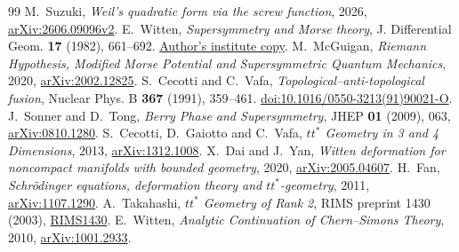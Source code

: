 \begin{thebibliography}{99}
M.~Suzuki, \emph{Weil's quadratic form via the screw function},
2026, \href{https://arxiv.org/abs/2606.09096v2}{arXiv:2606.09096v2}.
E.~Witten, \emph{Supersymmetry and Morse theory},
J. Differential Geom. \textbf{17} (1982), 661--692.
\href{https://www.ias.edu/sites/default/files/sns/files/supersymmetry-and-morse-theory-1982.pdf}{Author's institute copy}.
M.~McGuigan, \emph{Riemann Hypothesis, Modified Morse Potential and Supersymmetric Quantum Mechanics},
2020, \href{https://arxiv.org/abs/2002.12825}{arXiv:2002.12825}.
S.~Cecotti and C.~Vafa, \emph{Topological--anti-topological fusion},
Nuclear Phys. B \textbf{367} (1991), 359--461.
\href{https://doi.org/10.1016/0550-3213(91)90021-O}{doi:10.1016/0550-3213(91)90021-O}.
J.~Sonner and D.~Tong, \emph{Berry Phase and Supersymmetry},
JHEP \textbf{01} (2009), 063,
\href{https://arxiv.org/abs/0810.1280}{arXiv:0810.1280}.
S.~Cecotti, D.~Gaiotto and C.~Vafa, \emph{$tt^*$ Geometry in 3 and 4 Dimensions},
2013, \href{https://arxiv.org/abs/1312.1008}{arXiv:1312.1008}.
X.~Dai and J.~Yan, \emph{Witten deformation for noncompact manifolds with bounded geometry},
2020, \href{https://arxiv.org/abs/2005.04607}{arXiv:2005.04607}.
H.~Fan, \emph{Schr\"odinger equations, deformation theory and $tt^*$-geometry},
2011, \href{https://arxiv.org/abs/1107.1290}{arXiv:1107.1290}.
A.~Takahashi, \emph{$tt^*$ Geometry of Rank 2},
RIMS preprint 1430 (2003),
\href{https://www.kurims.kyoto-u.ac.jp/preprint/file/RIMS1430.pdf}{RIMS1430}.
E.~Witten, \emph{Analytic Continuation of Chern--Simons Theory},
2010, \href{https://arxiv.org/abs/1001.2933}{arXiv:1001.2933}.
\end{thebibliography}
